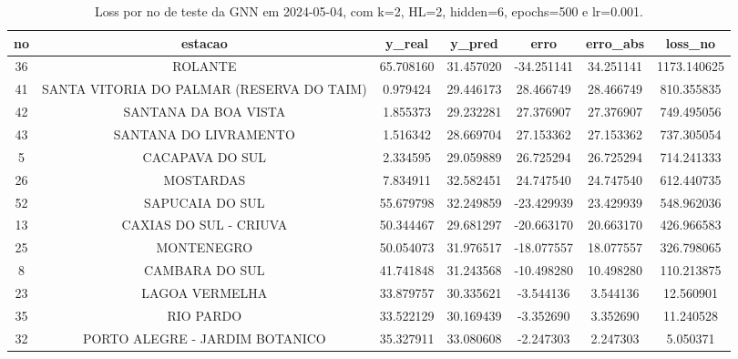 \begin{table}[h]
\centering
\caption{Loss por no de teste da GNN em 2024-05-04, com k=2, HL=2, hidden=6, epochs=500 e lr=0.001.}
\label{tab:gnn_loss_k2_hl2_h6_e500_d20240504}
\begin{tabular}{ccccccc}
\toprule
no & estacao & y\_real & y\_pred & erro & erro\_abs & loss\_no \\
\midrule
36 & ROLANTE & 65.708160 & 31.457020 & -34.251141 & 34.251141 & 1173.140625 \\
41 & SANTA VITORIA DO PALMAR (RESERVA DO TAIM) & 0.979424 & 29.446173 & 28.466749 & 28.466749 & 810.355835 \\
42 & SANTANA DA BOA VISTA & 1.855373 & 29.232281 & 27.376907 & 27.376907 & 749.495056 \\
43 & SANTANA DO LIVRAMENTO & 1.516342 & 28.669704 & 27.153362 & 27.153362 & 737.305054 \\
5 & CACAPAVA DO SUL & 2.334595 & 29.059889 & 26.725294 & 26.725294 & 714.241333 \\
26 & MOSTARDAS & 7.834911 & 32.582451 & 24.747540 & 24.747540 & 612.440735 \\
52 & SAPUCAIA DO SUL & 55.679798 & 32.249859 & -23.429939 & 23.429939 & 548.962036 \\
13 & CAXIAS DO SUL - CRIUVA & 50.344467 & 29.681297 & -20.663170 & 20.663170 & 426.966583 \\
25 & MONTENEGRO & 50.054073 & 31.976517 & -18.077557 & 18.077557 & 326.798065 \\
8 & CAMBARA DO SUL & 41.741848 & 31.243568 & -10.498280 & 10.498280 & 110.213875 \\
23 & LAGOA VERMELHA & 33.879757 & 30.335621 & -3.544136 & 3.544136 & 12.560901 \\
35 & RIO PARDO & 33.522129 & 30.169439 & -3.352690 & 3.352690 & 11.240528 \\
32 & PORTO ALEGRE - JARDIM BOTANICO & 35.327911 & 33.080608 & -2.247303 & 2.247303 & 5.050371 \\
\bottomrule
\end{tabular}
\end{table}
